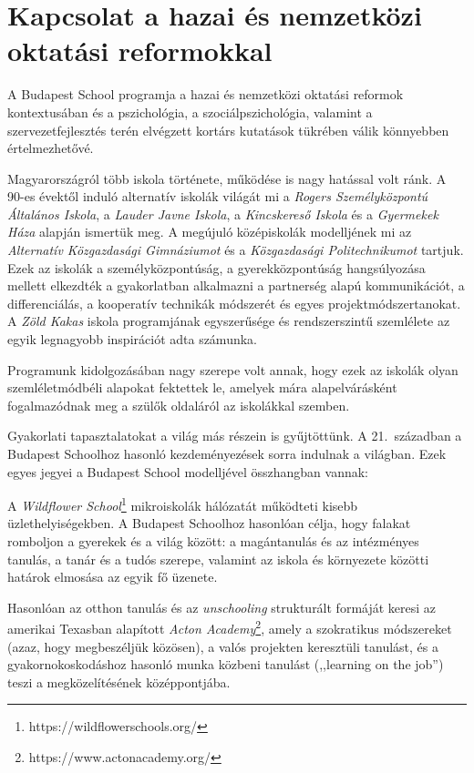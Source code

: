 \section{Kapcsolat a hazai és nemzetközi oktatási reformokkal}
\label{sec:kapcsolat_reformokkal}

A Budapest School programja a hazai és nemzetközi oktatási reformok kontextusában és a pszichológia, a szociálpszichológia, valamint a szervezetfejlesztés terén elvégzett kortárs kutatások tükrében válik könnyebben értelmezhetővé.

Magyarországról több iskola története, működése is nagy hatással volt ránk. A 90-es évektől induló alternatív iskolák világát mi a \emph{Rogers Személyközpontú Általános Iskola}, a \emph{Lauder Javne Iskola}, a \emph{Kincskereső Iskola} és a \emph{Gyermekek Háza} alapján ismertük meg. A megújuló középiskolák modelljének mi az \emph{Alternatív Közgazdasági Gimnáziumot} és a \emph{Közgazdasági Politechnikumot} tartjuk. Ezek az iskolák a személyközpontúság, a gyerekközpontúság hangsúlyozása mellett elkezdték a gyakorlatban alkalmazni a partnerség alapú kommunikációt, a differenciálás, a kooperatív technikák módszerét és egyes projektmódszertanokat. A \emph{Zöld Kakas} iskola programjának egyszerűsége és rendszerszintű szemlélete az egyik legnagyobb inspirációt adta számunka.

Programunk kidolgozásában nagy szerepe volt annak, hogy ezek az iskolák olyan szemléletmódbéli alapokat fektettek le, amelyek mára alapelvárásként fogalmazódnak meg a szülők oldaláról az iskolákkal szemben.

Gyakorlati tapasztalatokat a világ más részein is gyűjtöttünk. A 21.~században a Budapest Schoolhoz hasonló kezdeményezések sorra indulnak a világban. Ezek egyes jegyei a Budapest School modelljével összhangban vannak:

A \emph{Wildflower School}\footnote{https://wildflowerschools.org/} mikroiskolák hálózatát működteti kisebb üzlethelyiségekben. A Budapest Schoolhoz hasonlóan célja, hogy falakat romboljon a gyerekek és a világ között: a magántanulás és az intézményes tanulás, a tanár és a tudós szerepe, valamint az iskola és környezete közötti határok elmosása az egyik fő üzenete.

Hasonlóan az otthon tanulás és az  \emph{unschooling} strukturált formáját keresi az amerikai Texasban alapított \emph{Acton Academy}\footnote{https://www.actonacademy.org/}, amely a szokratikus módszereket (azaz, hogy megbeszéljük közösen), a valós projekten keresztüli tanulást, és a gyakornokoskodáshoz hasonló munka közbeni tanulást (,,learning on the job'') teszi a megközelítésének középpontjába.

